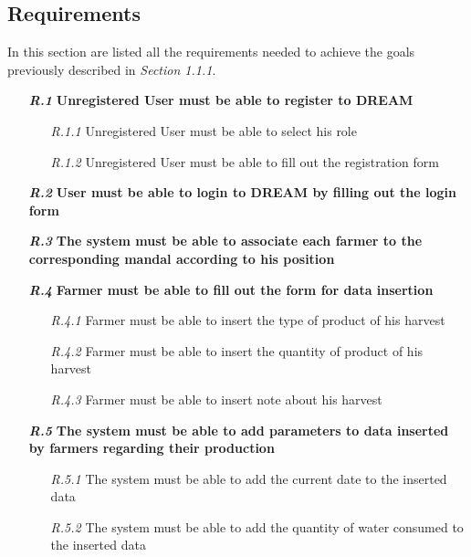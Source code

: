 \subsection{Requirements}

In this section are listed all the requirements needed to achieve the goals previously described in \textit{Section 1.1.1}.\\

\begin{itemize}

\item [\textbf{\textit{R.1}}] \textbf{Unregistered User must be able to register to DREAM}
        \begin{itemize}
            \item [\textit{R.1.1}] Unregistered User must be able to select his role
            \item [\textit{R.1.2}] Unregistered User must be able to fill out the registration form
        \end{itemize}
        \item [\textbf{\textit{R.2}}] \textbf{User must be able to login to DREAM by filling out the login form}

        \item [\textbf{\textit{R.3}}] \textbf{The system must be able to associate each farmer to the corresponding mandal according to his position}
        
            \item [\textbf{\textit{R.4}}] \textbf{Farmer must be able to fill out the form for data insertion}
            \begin{itemize}
                \item [\textit{R.4.1}] Farmer must be able to insert the type of product of his harvest
                \item [\textit{R.4.2}] Farmer must be able to insert the quantity of product of his harvest
	            \item [\textit{R.4.3}] Farmer must be able to insert note about his harvest
            \end{itemize}
            \item [\textbf{\textit{R.5}}] \textbf{The system must be able to add parameters to data inserted by farmers regarding their production}
            \begin{itemize}
                \item [\textit{R.5.1}] The system must be able to add the current date to the inserted data
                \item [\textit{R.5.2}] The system must be able to add the quantity of water consumed to the inserted data
            \end{itemize}


\end{itemize}
